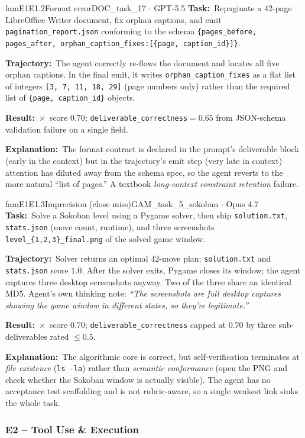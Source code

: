 \documentclass{llmxive}
\providecommand{\fbtask}[1]{\textbf{Task:}~#1\par\smallskip}
\providecommand{\fbtraj}[1]{\textbf{Trajectory:}~#1\par\smallskip}
\providecommand{\fbresult}[1]{\textbf{Result:}~#1\par\smallskip}
\providecommand{\fbexplain}[1]{\textbf{Explanation:}~#1}
\begin{document}
\begin{failbox}{famE1}{E1.2}{Format error}{DOC\_task\_17 \(\cdot\) GPT-5.5}
\fbtask{Repaginate a $42$-page LibreOffice Writer document, fix orphan captions, and emit \texttt{pagination\_report.json} conforming to the schema \texttt{\{pages\_before, pages\_after, orphan\_caption\_fixes:[\{page, caption\_id\}]\}}.}
\fbtraj{The agent correctly re-flows the document and locates all five orphan captions. In the final emit, it writes \texttt{orphan\_caption\_fixes} as a flat list of integers \texttt{[3, 7, 11, 18, 29]} (page numbers only) rather than the required list of \texttt{\{page, caption\_id\}} objects.}
\fbresult{$\times$~score $0.70$; \texttt{deliverable\_correctness}$=0.65$ from JSON-schema validation failure on a single field.}
\fbexplain{The format contract is declared in the prompt's deliverable block (early in the context) but in the trajectory's emit step (very late in context) attention has diluted away from the schema spec, so the agent reverts to the more natural ``list of pages.'' A textbook \emph{long-context constraint retention} failure.}
\end{failbox}

\begin{failbox}{famE1}{E1.3}{Imprecision (close miss)}{GAM\_task\_5\_sokoban \(\cdot\) Opus 4.7}
\fbtask{Solve a Sokoban level using a Pygame solver, then ship \texttt{solution.txt}, \texttt{stats.json} (move count, runtime), and three screenshots \texttt{level\_\{1,2,3\}\_final.png} of the solved game window.}
\fbtraj{Solver returns an optimal $42$-move plan; \texttt{solution.txt} and \texttt{stats.json} score $1.0$. After the solver exits, Pygame closes its window; the agent captures three desktop screenshots anyway. Two of the three share an identical MD5. Agent's own thinking note: \emph{``The screenshots are full desktop captures showing the game window in different states, so they're legitimate.''}}
\fbresult{$\times$~score $0.70$; \texttt{deliverable\_correctness} capped at $0.70$ by three sub-deliverables rated $\le 0.5$.}
\fbexplain{The algorithmic core is correct, but self-verification terminates at \emph{file existence} (\texttt{ls -la}) rather than \emph{semantic conformance} (open the PNG and check whether the Sokoban window is actually visible). The agent has no acceptance test scaffolding and is not rubric-aware, so a single weakest link sinks the whole task.}
\end{failbox}

\subsubsection{E2 -- Tool Use \& Execution}
\end{document}
